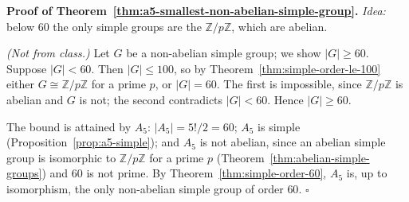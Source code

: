 \documentclass[11pt]{report}
\renewenvironment{proof}[1][Proof]{\noindent\textbf{#1.} }{\hfill$\square$\par\vspace{5pt}}
\begin{document}
\begin{proof}[Proof of Theorem~\ref{thm:a5-smallest-non-abelian-simple-group}]
\textit{Idea:} below $60$ the only simple groups are the $\mathbb{Z}/p\mathbb{Z}$, which are abelian.\par
\textit{(Not from class.)} Let $G$ be a non-abelian simple group; we show $|G| \geq 60$. Suppose $|G| < 60$. Then $|G| \leq 100$, so by Theorem~\ref{thm:simple-order-le-100} either $G \cong \mathbb{Z}/p\mathbb{Z}$ for a prime $p$, or $|G| = 60$. The first is impossible, since $\mathbb{Z}/p\mathbb{Z}$ is abelian and $G$ is not; the second contradicts $|G| < 60$. Hence $|G| \geq 60$.

The bound is attained by $A_5$: $|A_5| = 5!/2 = 60$; $A_5$ is simple (Proposition~\ref{prop:a5-simple}); and $A_5$ is not abelian, since an abelian simple group is isomorphic to $\mathbb{Z}/p\mathbb{Z}$ for a prime $p$ (Theorem~\ref{thm:abelian-simple-groups}) and $60$ is not prime. By Theorem~\ref{thm:simple-order-60}, $A_5$ is, up to isomorphism, the only non-abelian simple group of order $60$.
\end{proof}
\end{document}
